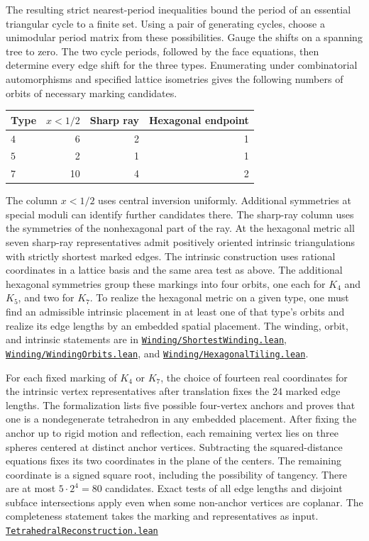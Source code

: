 \documentclass[11pt,letterpaper]{amsart}
\newcommand{\release}{bd3a0e03908481d738df30233cf95c641a1d3f71}
\newcommand{\src}[2]{\href{https://github.com/vltanh/lean4-origami-torus/blob/\release/#1}{\texttt{#2}}}
\begin{document}
The resulting strict nearest-period inequalities bound the
period of an essential triangular cycle to a finite set.
Using a pair of generating cycles, choose a unimodular
period matrix from these possibilities. Gauge the shifts
on a spanning tree to zero. The two cycle periods, followed
by the face equations, then determine every edge shift for
the three types. Enumerating under combinatorial automorphisms and
specified lattice isometries gives the following numbers of orbits
of necessary marking candidates.
\begin{center}
\begin{tabular}{@{}lrrr@{}}
\toprule
Type & \(x<1/2\) & Sharp ray & Hexagonal endpoint\\
\midrule
\(4\)&6&2&1\\
\(5\)&2&1&1\\
\(7\)&10&4&2\\
\bottomrule
\end{tabular}
\end{center}
The column \(x<1/2\) uses central inversion uniformly.
Additional symmetries at special moduli can identify further
candidates there. The sharp-ray column uses the symmetries of the
nonhexagonal part of the ray.
At the hexagonal metric all seven sharp-ray representatives admit
positively oriented intrinsic triangulations with strictly shortest
marked edges. The intrinsic construction uses rational coordinates in
a lattice basis and the same area test as above. The additional
hexagonal symmetries group these markings into four orbits, one each
for \(K_4\) and \(K_5\), and two for \(K_7\). To realize the
hexagonal metric on a given type, one must find an admissible
intrinsic placement in at least one of that type's orbits and realize
its edge lengths by an embedded spatial placement. The winding,
orbit, and intrinsic statements are in
\src{OrigamiTorus/Winding/ShortestWinding.lean}{Winding/ShortestWinding.lean},
\src{OrigamiTorus/Winding/WindingOrbits.lean}{Winding/WindingOrbits.lean},
and \src{OrigamiTorus/Winding/HexagonalTiling.lean}{Winding/HexagonalTiling.lean}.

For each fixed marking of \(K_4\) or \(K_7\), the choice of
fourteen real coordinates for the intrinsic vertex
representatives after translation fixes the 24 marked edge
lengths. The formalization lists five possible four-vertex
anchors and proves that one is a nondegenerate tetrahedron in
any embedded placement. After fixing the anchor up to rigid
motion and reflection, each remaining vertex lies on three
spheres centered at distinct anchor vertices. Subtracting the
squared-distance equations fixes its two coordinates in the
plane of the centers. The remaining coordinate is a signed
square root, including the possibility of tangency. There are at
most \(5\cdot 2^4=80\) candidates. Exact tests of all edge
lengths and disjoint subface intersections apply even when
some non-anchor vertices are coplanar. The completeness statement
takes the marking and representatives as input.
\src{OrigamiTorus/Geometry/TetrahedralReconstruction.lean}{TetrahedralReconstruction.lean}
\end{document}
